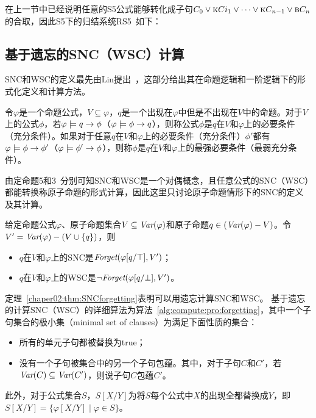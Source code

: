 在上一节中已经说明任意的S5公式能够转化成子句$C_0 \vee \textsc{k} Ci_1 \vee \dots \vee \textsc{k} C_{n-1} \vee \textsc{b} C_n$的合取，因此S5下的归结系统RS5~\cite{DBLP:journals/tcs/EnjalbertC89}如下：




\subsection{基于遗忘的SNC（WSC）计算}
SNC和WSC的定义最先由Lin提出~\cite{DBLP:journals/ai/Lin01}，这部分给出其在命题逻辑和一阶逻辑下的形式化定义和计算方法。

\begin{definition}
	令$\varphi$是一个命题公式，$V\subseteq \varphi$，$q$是一个出现在$\varphi$中但是不出现在$V$中的命题。对于$V$上的公式$\phi$，若$\varphi \models q \rightarrow \phi$（$\varphi \models \phi \rightarrow q$），则称公式$\phi$是$q$在$V$和$\varphi$上的必要条件（充分条件）。如果对于任意$q$在$V$和$\varphi$上的必要条件（充分条件）$\phi'$都有$\varphi \models \phi \rightarrow \phi'$（$\varphi \models \phi' \rightarrow \phi$），则称$\phi$是$q$在$V$和$\varphi$上的最强必要条件（最弱充分条件）。
\end{definition}

由定命题5和3~\cite{DBLP:journals/ai/Lin01}分别可知SNC和WSC是一个对偶概念，且任意公式的SNC（WSC）都能转换称原子命题的形式计算，因此这里只讨论原子命题情形下的SNC的定义及其计算。

\begin{theorem}\label{chaper02:thm:SNCforgetting}
	给定命题公式$\varphi$、原子命题集合$V\subseteq \textit{Var}(\varphi)$和原子命题$q\in (\textit{Var}(\varphi)-V)$。令$V'= \textit{Var}(\varphi) - (V\cup \{q\})$，则
	\begin{itemize}
		\item $q$在$V$和$\varphi$上的SNC是$\textit{Forget}(\varphi[q/\top], V')$；
		\item $q$在$V$和$\varphi$上的WSC是$\neg \textit{Forget}(\varphi[q/\bot], V')$。
	\end{itemize}
\end{theorem}


定理~\ref{chaper02:thm:SNCforgetting}表明可以用遗忘计算SNC和WSC。
基于遗忘的计算SNC（WSC）的详细算法为算法~\ref{alg:compute:pro:forgetting}，其中一个子句集合的极小集（minimal set of clauses）为满足下面性质的集合：
\begin{itemize}
	\item 所有的单元子句都被替换为true；
	\item 没有一个子句被集合中的另一个子句包蕴。其中，对于子句$C$和$C'$，若$\textit{Var}(C) \subseteq \textit{Var}(C')$，则说子句$C$包蕴$C'$。
\end{itemize}
此外，对于公式集合$S$，$S[X/Y]$为将$S$每个公式中$X$的出现全都替换成$Y$，即$S[X/Y]=\{\varphi[X/Y]\mid \varphi\in S\}$。

